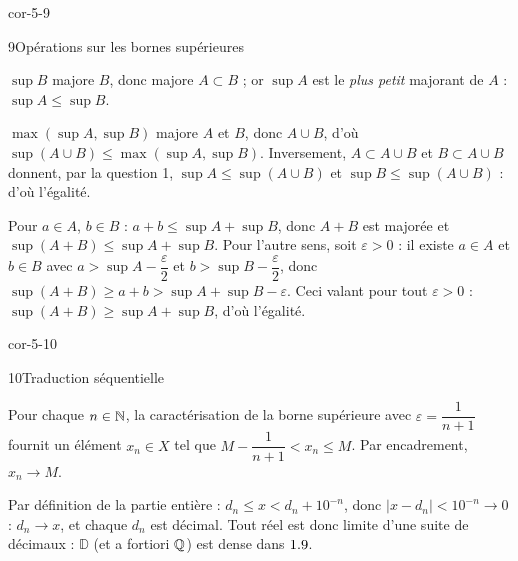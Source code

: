 \begin{blocLivre}{cor-5-9}
\begin{corrige}{9}{Opérations sur les bornes supérieures}
\begin{questions}
  \item $\sup B$ majore $B$, donc majore $A\subset B$ ; or $\sup A$ est le
    \emph{plus petit} majorant de $A$ : $\sup A\leq\sup B$.
  \item $\max(\sup A,\sup B)$ majore $A$ et $B$, donc $A\cup B$, d'où
    $\sup(A\cup B)\leq\max(\sup A,\sup B)$. Inversement, $A\subset A\cup B$
    et $B\subset A\cup B$ donnent, par la question 1,
    $\sup A\leq\sup(A\cup B)$ et $\sup B\leq\sup(A\cup B)$ :
    d'où l'égalité.
  \item Pour $a\in A$, $b\in B$ : $a+b\leq\sup A+\sup B$, donc $A+B$ est
    majorée et $\sup(A+B)\leq\sup A+\sup B$. Pour l'autre sens, soit
    $\varepsilon>0$ : il existe $a\in A$ et $b\in B$ avec
    $a>\sup A-\dfrac{\varepsilon}{2}$ et $b>\sup B-\dfrac{\varepsilon}{2}$,
    donc $\sup(A+B)\geq a+b>\sup A+\sup B-\varepsilon$. Ceci valant pour
    tout $\varepsilon>0$ : $\sup(A+B)\geq\sup A+\sup B$, d'où l'égalité.
\end{questions}
\end{corrige}
\end{blocLivre}

\begin{blocLivre}{cor-5-10}
\begin{corrige}{10}{Traduction séquentielle}
\begin{questions}
  \item Pour chaque $n\in\mathbb{N}$, la caractérisation de la borne supérieure avec
    $\varepsilon=\dfrac{1}{n+1}$ fournit un élément $x_n\in X$ tel que
    $M-\dfrac{1}{n+1}<x_n\leq M$. Par encadrement, $x_n\to M$.
  \item Par définition de la partie entière :
    $d_n\leq x<d_n+10^{-n}$, donc $|x-d_n|<10^{-n}\to0$ : $d_n\to x$, et
    chaque $d_n$ est décimal. Tout réel est donc limite d'une suite de
    décimaux : $\mathbb{D}$ (et a fortiori $\mathbb{Q}$) est dense dans $1.9$.
\end{questions}
\end{corrige}
\end{blocLivre}

